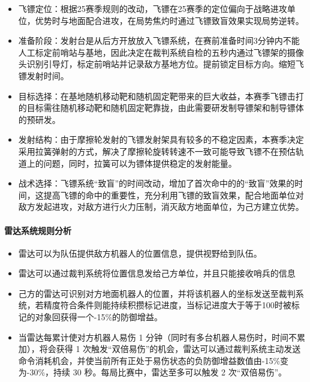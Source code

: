             \begin{itemize}
                \item 飞镖定位：根据25赛季规则的改动，飞镖在25赛季的定位偏向于战略进攻单位，优势时与地面配合进攻，在局势焦灼时通过飞镖致盲效果实现局势逆转。
                \item 准备阶段：发射台是从后方开放放入飞镖系统，在赛前准备时间3分钟内不能人工标定前哨站与基地，因此决定在裁判系统自检的五秒内通过飞镖架的摄像头识别引导灯，标定前哨站并记录敌方基地方位。提前锁定目标方向。缩短飞镖发射时间。
                \item 目标选择：在基地随机移动靶和随机固定靶带来的巨大收益，本赛季飞镖击打的目标需往随机移动靶和随机固定靶靠拢，由此需要研发制导镖架和制导镖体的预研发。
                \item 发射结构：由于摩擦轮发射的飞镖发射架具有较多的不稳定因素，本赛季决定采用拉簧弹射的方式，解决了摩擦轮旋转转速不一致可能导致飞镖不在预估轨道上的问题，同时，拉簧可以为镖体提供稳定的发射能量。
                \item 战术选择：飞镖系统“致盲”的时间改动，增加了首次命中的的“致盲”效果的时间，这提高飞镖的命中的重要性，充分利用飞镖的致盲效果，配合地面单位对敌方发起进攻，对敌方进行火力压制，消灭敌方地面单位，为己方建立优势。
            \end{itemize}

        \paragraph{雷达系统规则分析}

        
            \begin{itemize}
                \item 雷达可以为队伍提供敌方机器人的位置信息，提供视野给到队伍。
                \item 雷达可以通过裁判系统将位置信息发给己方单位，并且只能接收哨兵的信息
                \item 己方的雷达可识别对方地面机器人的位置，并将该机器人的坐标发送至裁判系统，若精度符合条件则能持续积攒标记进度，当标记进度大于等于100时被标记的对象回获得一个-15\%的防御增益。
                \item 当雷达每累计使对方机器人易伤 1 分钟（同时有多台机器人易伤时，时间不累加），将会获得 1 次触发“双倍易伤”的机会，雷达可以通过裁判系统主动发送命令消耗机会，并使当前所有正处于易伤状态的负防御增益数值由-15\%变为-30\%，持续 30 秒。每局比赛中，雷达至多可以触发 2 次“双倍易伤”。
            \end{itemize}


